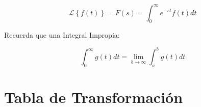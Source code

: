 \documentclass[12pt]{report}                                    %
\newcommand{\Vector}[1]{                                        %
        \ensuremath{\begin{matrix}#1\end{matrix}}                   %
    }
\newcommand{\LaplaceTransformation}[1]{                         %
        \mathscr{L} \left\{ #1 \right\}                             %
    }
\newcommand{\Laplace}[1]{                                      
        \LaplaceTransformation{#1}
    }
\begin{document}
        \begin{equation}   
            \Laplace{f(t)} = F(s) = \int_0^\infty e^{-st} f(t) dt 
        \end{equation}    

        Recuerda que una Integral Impropia:

        \begin{equation*}   
            \int_0^\infty g(t) dt = \lim_{b \to \infty} \int_a^b g(t) dt
        \end{equation*}  


    \clearpage
    \section{Tabla de Transformación}
\end{document}
